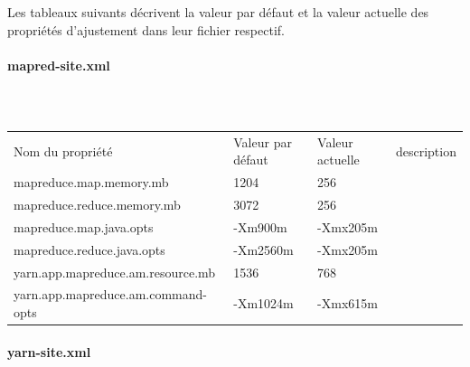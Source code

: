 \documentclass[12pt,english]{book}
\begin{document}
Les tableaux suivants décrivent la valeur par défaut et la valeur actuelle des propriétés d’ajustement dans leur fichier respectif. 

\paragraph{mapred-site.xml}\mbox{}\\

\begin{table}[H]
\begin{tabular}{llll}
\rowcolor[HTML]{4472C4} 
{\color[HTML]{FFFFFF} Nom du propriété} & {\color[HTML]{FFFFFF} Valeur par défaut} & {\color[HTML]{FFFFFF} Valeur actuelle} & {\color[HTML]{FFFFFF} description} \\
\rowcolor[HTML]{D9E2F3} 
mapreduce.map.memory.mb                 & 1204                                     & 256                                    &                                    \\
mapreduce.reduce.memory.mb              & 3072                                     & 256                                    &                                    \\
\rowcolor[HTML]{D9E2F3} 
mapreduce.map.java.opts                 & -Xm900m                                  & -Xmx205m                               &                                    \\
mapreduce.reduce.java.opts              & -Xm2560m                                 & -Xmx205m                               &                                    \\
\rowcolor[HTML]{D9E2F3} 
yarn.app.mapreduce.am.resource.mb       & 1536                                     & 768                                    &                                    \\
yarn.app.mapreduce.am.command-opts      & -Xm1024m                                 & -Xmx615m                               &                                   
\end{tabular}
\caption{}
\end{table}

\paragraph{yarn-site.xml}\mbox{}\\
\end{document}
